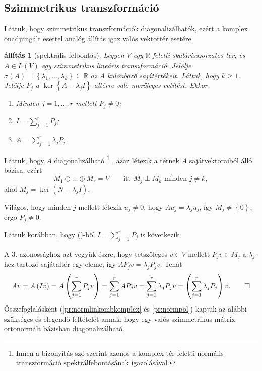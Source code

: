 \documentclass[a4paper, showtrims]{memoir}
\makeatletter
\renewenvironment{proof}[1][\proofname]
    {\par\pushQED{\qed}%
    \normalfont \topsep6\p@\@plus6\p@\relax
    \trivlist
    \item[\hskip\labelsep
        \itshape
    #1\@addpunct{:}]\ignorespaces}
    {\popQED\endtrivlist\@endpefalse}
\theoremstyle{plain}
\newtheorem{proposition}{állítás}[chapter]
\theoremstyle{remark}
\theoremstyle{definition}
\makeatother
\begin{document}
\subsection{Szimmetrikus transzformáció}
Láttuk, hogy szimmetrikus transzformációk diagonalizálhatók,
ezért a komplex önadjungált esettel analóg állítás igaz valós vektortér esetére.
\begin{proposition}[spektrális felbontás]
	Legyen $V$ egy $\mathbb{R}$ feletti skalárisszorzatos-tér, és $A\in L\left( V \right)$
	egy szimmetrikus lineáris transzformáció.
	Jelölje $\sigma\left( A \right)=\left\{\lambda_1,\ldots,\lambda_k  \right\}\subseteq\mathbb{R}$ az $A$ különböző sajátértékeit.
	Láttuk, hogy $k\geq 1$.
	Jelölje $P_j$ a $\ker\left\{ A-\lambda_jI \right\}$ altérre való merőleges vetítést.
	Ekkor
	\begin{enumerate}
		\item Minden $j=1,\ldots,r$ mellett $P_j\neq 0$;
		\item $I=\sum_{j=1}^rP_j$;
		\item $A=\sum_{j=1}^r\lambda_jP_j$.
		      \qedhere
	\end{enumerate}
\end{proposition}
\begin{proof}
	Láttuk, hogy $A$ diagonalizálható
	\footnote{Innen a bizonyítás szó szerint azonos a komplex tér feletti normális transzformáció spektrálfebontásának igazolásával.}%
	, azaz létezik a térnek $A$ sajátvektoraiból álló
	bázisa,
	ezért
	\[
		M_1\oplus\dots\oplus M_r=V
		\qquad\text{itt }M_j\perp M_k\text{ minden }j\neq k,\tag{\dag}
	\]
	ahol $M_j=\ker\left( N-\lambda_jI \right)$.

	Világos,
	hogy minden $j$ mellett létezik $u_j\neq 0$, hogy $Au_j=\lambda_ju_j$,
	így $M_j\neq \left\{ 0 \right\}$,
	ergo $P_j\neq 0.$

	Láttuk korábban, hogy (\dag)-ből $I=\sum_{j=1}^{r}P_j$ is következik.

	A 3. azonossághoz azt vegyük észre,
	hogy tetszőleges $v\in V$ mellett $P_jv\in M_j$ a $\lambda_j$-hez tartozó sajátaltér egy eleme,
	így $AP_jv=\lambda_jP_jv$. Tehát
	\[
		Av
		=
		A\left( Iv \right)
		=
		A\left( \sum_{j=1}^rP_jv \right)
		=
		\sum_{j=1}^rAP_jv
		=
		\sum_{j=1}^r\lambda_jP_jv
		=
		\left( \sum_{j=1}^r\lambda_jP_j \right)v.
		\qedhere
	\]
\end{proof}
Összefoglalásként (\ref{pr:normlinkombkomplex} és \ref{pr:normpol}) kapjuk az alábbi szükséges és elegendő feltételét annak,
hogy egy valós szimmetrikus mátrix ortonormált bázisban diagonalizálható.
\end{document}
